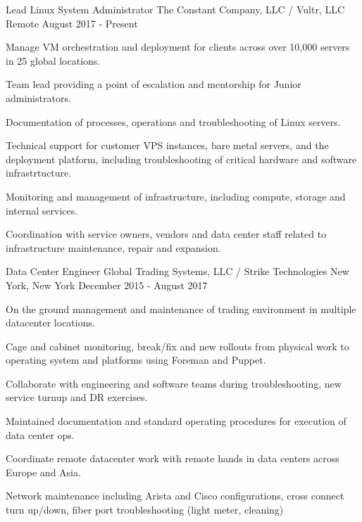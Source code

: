 
\begin{cventries}

	\cventry
	{Lead Linux System Administrator}
	{The Constant Company, LLC / Vultr, LLC}
	{Remote}
	{August 2017 - Present}
	{
		\begin{cvitems}
		\item {Manage VM orchestration and deployment for clients across over 10,000 servers in 25 global locations.}
		\item {Team lead providing a point of escalation and mentorship for Junior administrators.}
		\item {Documentation of processes, operations and troubleshooting of Linux servers.}
		\item {Technical support for customer VPS instances, bare metal servers, and the deployment platform, including troubleshooting of critical hardware and software infrastrtucture.}
		\item {Monitoring and management of infrastructure, including compute, storage and internal services.}
		\item {Coordination with service owners, vendors and data center staff related to infrastructure maintenance, repair and expansion.}
		\end{cvitems}
	}


	\cventry
	{Data Center Engineer}
	{Global Trading Systems, LLC / Strike Technologies}
	{New York, New York}
	{December 2015 - August 2017}
	{
		\begin{cvitems}
		\item {On the ground management and maintenance of trading environment in multiple datacenter locations.}
		\item {Cage and cabinet monitoring, break/fix and new rollouts from physical work to operating system and platforms using Foreman and Puppet.}
		\item {Collaborate with engineering and software teams during troubleshooting, new service turnup and DR exercises.}
		\item {Maintained documentation and standard operating procedures for execution of data center ops.}
		\item {Coordinate remote datacenter work with remote hands in data centers across Europe and Asia.}
		\item {Network maintenance including Arista and Cisco configurations, cross connect turn up/down, fiber port troubleshooting (light meter, cleaning)}
		\end{cvitems}
	}


\end{cventries}
